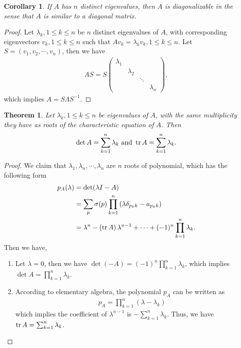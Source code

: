 \documentclass[11pt]{book}
\newtheorem{theorem}{Theorem}[chapter]
\newtheorem{corollary}{Corollary}[theorem]
\theoremstyle{definition}
\numberwithin{equation}{chapter}
\begin{document}
\medskip

\begin{corollary}
If $A$ has $n$ distinct eigenvalues, then $A$ is diagonalizable in the sense that $A$ is similar to a diagonal matrix.
\end{corollary}
\begin{proof}
Let $\lambda_k,1\leq k\leq n$ be $n$ distinct eigenvalues of $A$, with corresponding eigenvectors $v_k,1\leq k\leq n$ such that $Av_k = \lambda_k v_k,1\leq k\leq n$. Let $S = (v_1, v_2,\cdots, v_n)$, then we have
\begin{align*}
    AS = S \begin{pmatrix}
    \lambda_1 &  &  &  \\
     & \lambda_2 &  & \\
     &   & \ddots &  \\
     &  &  & \lambda_n
    \end{pmatrix},
\end{align*}
which implies $A = S\Lambda S^{-1}$.
\end{proof}

\medskip

\begin{theorem}
Let $\lambda_k,1\leq k\leq n$ be eigenvalues of $A$, with the same multiplicity they have as roots of the characteristic equation of $A$. Then 
\begin{align*}
    \det A = \sum^n_{k=1}\lambda_k \,\,\text{and}\,\, \tr A = \sum^n_{k=1}\lambda_k.
\end{align*}
\end{theorem}
\begin{proof}
We claim that $\lambda_1,\lambda_n,\cdots,\lambda_n$ are $n$ roots of polynomial, which has the following form
\begin{align*}
    p_A(\lambda) & = \det (\lambda I - A) \\
    & = \sum_p \sigma(p) \prod^n_{k=1} \left(\lambda \delta_{p_k k} - a_{p_k k}\right) \\
    & = \lambda^n - \left(\tr A \right)\lambda^{n-1} +\cdots + (-1)^n \prod^n_{k=1}\lambda_k.
\end{align*}
Then we have,
\begin{enumerate}[label=(\alph*)]
    \item Let $\lambda = 0$, then we have $\det (-A) = (-1)^n \prod^n_{k=1}\lambda_k$, which implies $\det A = \prod^n_{k=1}\lambda_k$.
    \item According to elementary algebra, the polynomial $p_A$ can be written as 
    \begin{align*}
        p_A = \prod^n_{k=1} (\lambda - \lambda_k)
    \end{align*}
    which implies the coefficient of $\lambda^{n-1}$ is $ - \sum^n_{k=1}\lambda_k$. Thus, we have $\tr A = \sum^n_{k=1}\lambda_k$.
\end{enumerate}
\end{proof}
\end{document}
